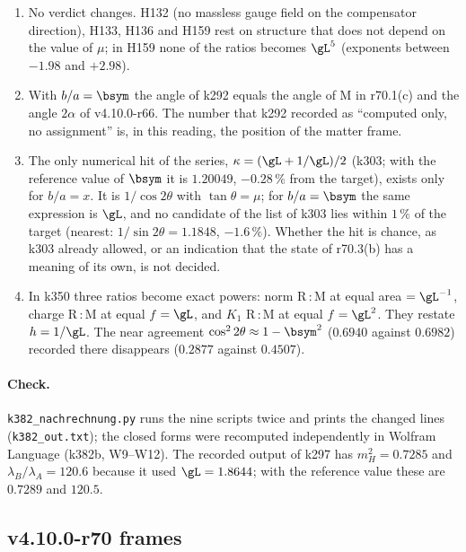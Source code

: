 \begin{enumerate}[leftmargin=2em]
\item[(a)] No verdict changes.  H132 (no massless gauge field on the compensator direction), H133, H136 and H159 rest on structure that does
not depend on the value of \(\mu\); in H159 none of the ratios becomes \(\gL^5\) (exponents between \(-1.98\) and \(+2.98\)).
\item[(b)] With \(b/a=\bsym\) the angle of k292 equals the angle of M in r70.1(c) and the angle \(2\alpha\) of v4.10.0-r66.  The number that k292
recorded as ``computed only, no assignment'' is, in this reading, the position of the matter frame.
\item[(c)] The only numerical hit of the series, \(\kappa=(\gL+1/\gL)/2\) (k303; with the reference value of \(\bsym\) it is \(1.20049\),
\(-0.28\,\%\) from the target), exists only for \(b/a=x\).  It is \(1/\cos2\theta\) with \(\tan\theta=\mu\); for \(b/a=\bsym\) the same expression is
\(\gL\), and no candidate of the list of k303 lies within \(1\,\%\) of the target (nearest: \(1/\sin2\theta=1.1848\), \(-1.6\,\%\)).  Whether the hit
is chance, as k303 already allowed, or an indication that the state of r70.3(b) has a meaning of its own, is not decided.
\item[(d)] In k350 three ratios become exact powers: norm R\,:\,M at equal area \(=\gL^{-1}\), charge R\,:\,M at equal \(f\) \(=\gL\), and
\(K_1\) R\,:\,M at equal \(f\) \(=\gL^{2}\).  They restate \(h=1/\gL\).  The near agreement \(\cos^22\theta\approx1-\bsym^2\) (\(0.6940\) against \(0.6982\))
recorded there disappears (\(0.2877\) against \(0.4507\)).
\end{enumerate}

\paragraph{Check.}
\texttt{k382\_nachrechnung.py} runs the nine scripts twice and prints the changed lines (\texttt{k382\_out.txt}); the closed forms were
recomputed independently in Wolfram Language (k382b, W9--W12).  The recorded output of k297 has \(m_H^2=0.7285\) and \(\lambda_B/\lambda_A=120.6\)
because it used \(\gL=1.8644\); with the reference value these are \(0.7289\) and \(120.5\).

\subsection*{v4.10.0-r70 frames}
\label{subsec:v4100-r70-frames}

